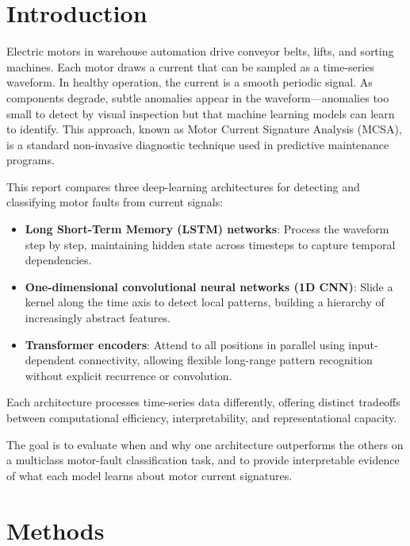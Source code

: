 \documentclass[10pt,twocolumn]{article}
\begin{document}

\section{Introduction} 
\label{sec:introduction}

Electric motors in warehouse automation drive conveyor belts, lifts, and sorting machines. Each motor draws a current that can be sampled as a time-series waveform. In healthy operation, the current is a smooth periodic signal. As components degrade, subtle anomalies appear in the waveform—anomalies too small to detect by visual inspection but that machine learning models can learn to identify. This approach, known as Motor Current Signature Analysis (MCSA), is a standard non-invasive diagnostic technique used in predictive maintenance programs.

This report compares three deep-learning architectures for detecting and classifying motor faults from current signals:

\begin{itemize}
	\item \textbf{Long Short-Term Memory (LSTM) networks}: Process the waveform step by step, maintaining hidden state across timesteps to capture temporal dependencies.
	
	\item \textbf{One-dimensional convolutional neural networks (1D CNN)}: Slide a kernel along the time axis to detect local patterns, building a hierarchy of increasingly abstract features.
	
	\item \textbf{Transformer encoders}: Attend to all positions in parallel using input-dependent connectivity, allowing flexible long-range pattern recognition without explicit recurrence or convolution.
\end{itemize}

Each architecture processes time-series data differently, offering distinct tradeoffs between computational efficiency, interpretability, and representational capacity.

The goal is to evaluate when and why one architecture outperforms the others on a multiclass motor-fault classification task, and to provide interpretable evidence of what each model learns about motor current signatures.

\section{Methods}
\end{document}
